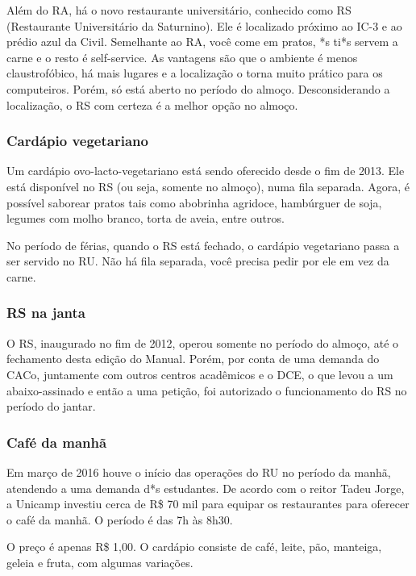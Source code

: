Além do RA, há o novo restaurante universitário, conhecido como RS (Restaurante
Universitário da Saturnino). Ele é localizado próximo ao IC-3 e ao prédio azul
da Civil. Semelhante ao RA, você come em pratos, *s ti*s servem a carne e o
resto é self-service. As vantagens são que o ambiente é menos claustrofóbico, há
mais lugares e a localização o torna muito prático para os computeiros. Porém,
só está aberto no período do almoço. Desconsiderando a localização, o RS com
certeza é a melhor opção no almoço.

\subsubsection{Cardápio vegetariano}

Um cardápio ovo-lacto-vegetariano está sendo oferecido desde o fim de 2013. Ele
está disponível no RS (ou seja, somente no almoço), numa fila separada. Agora, é
possível saborear pratos tais como abobrinha agridoce, hambúrguer de soja,
legumes com molho branco, torta de aveia, entre outros.

No período de férias, quando o RS está fechado, o cardápio vegetariano passa a
ser servido no RU. Não há fila separada, você precisa pedir por ele em vez da
carne.

\subsubsection{RS na janta}

O RS, inaugurado no fim de 2012, operou somente no período do almoço, até o
fechamento desta edição do Manual. Porém, por conta de uma demanda do CACo,
juntamente com outros centros acadêmicos e o DCE, o que levou a um
abaixo-assinado e então a uma petição, foi autorizado o funcionamento do RS no
período do jantar.

\subsubsection{Café da manhã}

Em março de 2016 houve o início das operações do RU no período da manhã, 
atendendo a uma demanda d*s estudantes. De acordo com o reitor Tadeu Jorge, 
a Unicamp investiu cerca de R\$ 70 mil para equipar os restaurantes para
oferecer o café da manhã. O período é das 7h às 8h30.

O preço é apenas R\$ 1,00. O cardápio consiste de café, leite, pão, manteiga,
geleia e fruta, com algumas variações.

